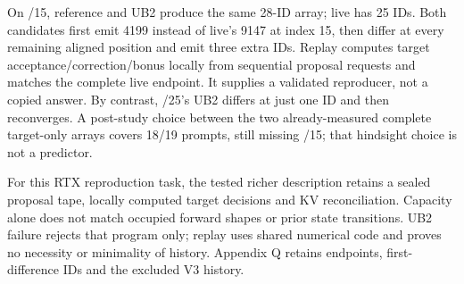 On /15, reference and UB2 produce the same 28-ID array; live has 25 IDs. Both candidates first emit 4199 instead of live's 9147 at index 15, then differ at every remaining aligned position and emit three extra IDs. Replay computes target acceptance/correction/bonus locally from sequential proposal requests and matches the complete live endpoint. It supplies a validated reproducer, not a copied answer. By contrast, /25's UB2 differs at just one ID and then reconverges. A post-study choice between the two already-measured complete target-only arrays covers 18/19 prompts, still missing /15; that hindsight choice is not a predictor.

For this RTX reproduction task, the tested richer description retains a sealed proposal tape, locally computed target decisions and KV reconciliation. Capacity alone does not match occupied forward shapes or prior state transitions. UB2 failure rejects that program only; replay uses shared numerical code and proves no necessity or minimality of history. Appendix Q retains endpoints, first-difference IDs and the excluded V3 history.
